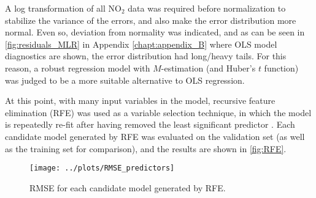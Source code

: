 A log transformation of all NO$_2$ data was required before normalization to stabilize the variance of the errors, and also make the error distribution more normal. Even so, deviation from normality was indicated, and as can be seen in \cref{fig:residuals_MLR} in Appendix \ref{chapt:appendix_B} where OLS model diagnostics are shown, the error distribution had long/heavy tails. For this reason, a robust regression model with $M$-estimation (and Huber's $t$ function) was judged to be a more suitable alternative to OLS regression.

At this point, with many input variables in the model, recursive feature elimination (RFE) was used as a variable selection technique, in which the model is repeatedly re-fit after having removed the least significant predictor \cite{Faraway2020}. Each candidate model generated by RFE was evaluated on the validation set (as well as the training set for comparison), and the results are shown in \vref{fig:RFE}. 
\begin{figure}[h] 
\begin{center}
\texttt{[image: ../plots/RMSE\_predictors]}
\caption{RMSE for each candidate model generated by RFE.}
\label{fig:RFE}
\end{center}
\end{figure}

